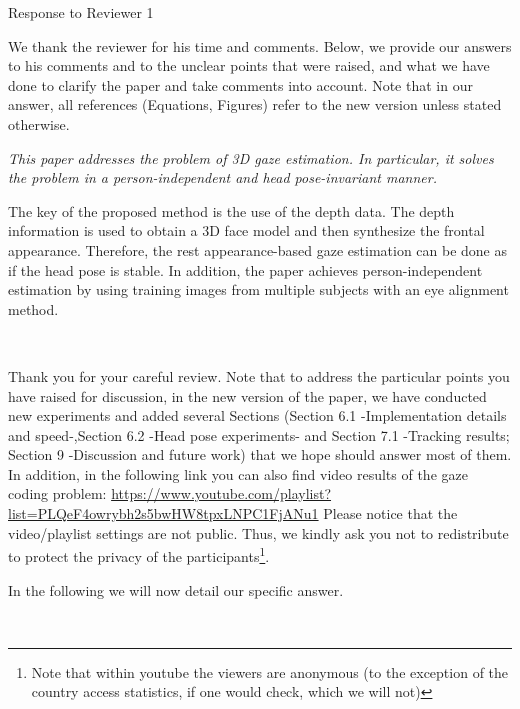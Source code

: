 \newcommand{\rev}[1]{{\noindent {\bf Comment:} {\it #1}}~\\}
\newcommand{\ans}[1]{{\noindent {\bf Response:} #1}~\\}
\newcommand{\td}[1]{{\noindent {\bf TODO:} #1}~\\}



{\large \noindent Response to Reviewer 1}\newline


\noindent We thank the reviewer for his time and comments.
Below, we provide our answers to his comments and to the unclear points that were raised,
and what we have done to clarify the paper and take comments into account.
Note that in our answer, all references (Equations, Figures)
refer to the new version unless stated otherwise.

\vspace*{4mm}

\rev{This paper addresses the problem of 3D gaze estimation. In particular, it solves the problem in a person-independent and head pose-invariant manner.

The key of the proposed method is the use of the depth data. The depth information is used to obtain a 3D face model and then synthesize the frontal appearance. Therefore, the rest appearance-based gaze estimation can be done as if the head pose is stable. In addition, the paper achieves person-independent estimation by using training images from multiple subjects with an eye alignment method.}

\ans{Thank you for your careful review.
Note that to address the particular points  you have raised for discussion, in the new version of the paper,
we have conducted new experiments and added several Sections (Section 6.1 -Implementation details and speed-,Section 6.2 -Head pose experiments-
and Section 7.1 -Tracking results; Section 9 -Discussion and future work) that we hope should answer most of them.
In addition, in the following link you can also find video results of the gaze coding problem:
\newline
\newline
\url{https://www.youtube.com/playlist?list=PLQeF4owrybh2s5bwHW8tpxLNPC1FjANu1}
\newline
\newline
Please notice that the video/playlist settings are not public. Thus, we kindly ask you not to redistribute to protect the privacy of the participants\footnote{Note that within youtube the viewers are anonymous (to the exception of the country access statistics, if one would check, which we will not)}.

In the following we will now detail our specific answer.
}

